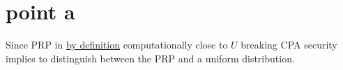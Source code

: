 \section{point a}

Since PRP in \underline{by definition} computationally close to $U$ breaking CPA security implies to distinguish between the PRP and a uniform distribution.